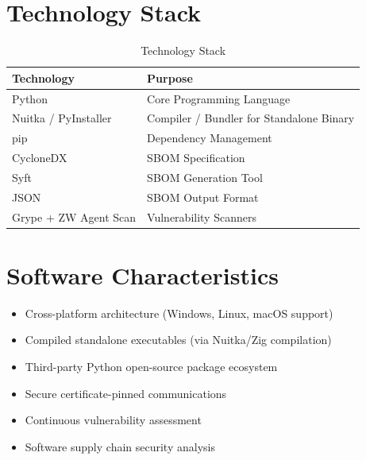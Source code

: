 \vspace{0.4cm}


\section{Technology Stack}

\begin{table}[H]
\centering
\small
\renewcommand{\arraystretch}{1.3}

\begin{tabular}{p{5cm}p{8cm}}
\toprule
\rowcolor{ZWPrimary}
\textbf{\color{white}Technology} & \textbf{\color{white}Purpose} \\
\midrule
Python & Core Programming Language \\
Nuitka / PyInstaller & Compiler / Bundler for Standalone Binary \\
pip & Dependency Management \\
CycloneDX & SBOM Specification \\
Syft & SBOM Generation Tool \\
JSON & SBOM Output Format \\
Grype + ZW Agent Scan & Vulnerability Scanners \\
\bottomrule
\end{tabular}
\caption{Technology Stack}
\end{table}

\vspace{0.4cm}


\section{Software Characteristics}

\begin{itemize}
\item Cross-platform architecture (Windows, Linux, macOS support)
\item Compiled standalone executables (via Nuitka/Zig compilation)
\item Third-party Python open-source package ecosystem
\item Secure certificate-pinned communications
\item Continuous vulnerability assessment
\item Software supply chain security analysis
\end{itemize}

